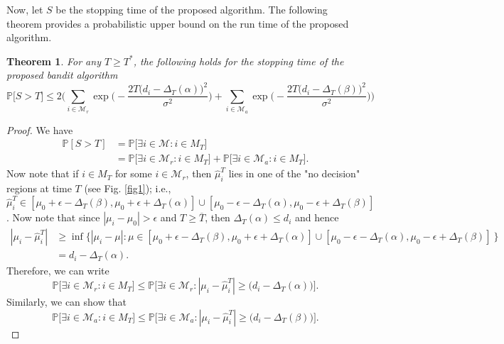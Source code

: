 \documentclass[12pt]{article}
\def\P{\mathbb{P}}
\def\MM{\mathcal{M}}
\def\T{\overline{T}}
\newtheorem{theorem}{Theorem}
\begin{document}
Now, let $S$ be the stopping time of the proposed algorithm. The following theorem provides a probabilistic upper bound on the run time of the proposed algorithm. 
\begin{theorem}
\label{thm1}
For any $T\geq T^*$, the following holds for the stopping time of the proposed bandit algorithm
\begin{equation}
\label{runbound1}
\P\big[S>T\big]\leq 2\Bigg(\sum_{i\in\MM_r}\exp\bigg(-\frac{2T\big(d_i - \Delta_T(\alpha)\big)^2}{\sigma^2}\bigg)+\sum_{i\in\MM_a}\exp\bigg(-\frac{2T\big(d_i - \Delta_T(\beta)\big)^2}{\sigma^2}\bigg)\Bigg)
\end{equation}
\end{theorem}
\begin{proof}
We have
\begin{equation}
\label{thm1eq0}
\begin{aligned}
\P[S>T] & = \P\big[\exists i\in\MM: i\in M_T\big] \\
&=\P\big[\exists i\in\MM_r: i\in M_T\big] + \P\big[\exists i\in\MM_a: i\in M_T\big] .
\end{aligned}
\end{equation}
Now note that if $i\in M_T$ for some $i\in \MM_r$, then $\hat\mu_i^T$ lies in one of the "no decision" regions at time $T$ (see Fig. \ref{fig1}); i.e., $\hat\mu_i^T \in [\mu_0+\epsilon-\Delta_T(\beta), \mu_0+\epsilon +\Delta_T(\alpha)]\cup [\mu_0-\epsilon-\Delta_T(\alpha), \mu_0-\epsilon +\Delta_T(\beta)]$. Now note that since  $|\mu_i-\mu_0|>\epsilon$ and $T\geq\T$, then $\Delta_T(\alpha)\leq d_i$ and hence 
\begin{equation*}
\begin{aligned}
|\mu_i - \hat\mu^T_i|  &\geq \inf\Big\{|\mu_i-\mu| : \mu\in [\mu_0+\epsilon-\Delta_T(\beta), \mu_0+\epsilon +\Delta_T(\alpha)]\cup [\mu_0-\epsilon-\Delta_T(\alpha), \mu_0-\epsilon +\Delta_T(\beta)]~\Big\}\\
& = d_i - \Delta_T(\alpha).
\end{aligned}
\end{equation*}
Therefore, we can write 
\begin{equation}
\label{thm1eq1}
\P\big[\exists i\in\MM_r: i\in M_T\big] \leq \P\big[\exists i\in\MM_r: |\mu_i-\hat\mu^T_i|\geq \big(d_i-\Delta_T(\alpha)\big)\big].
\end{equation}
Similarly, we can show that 
\begin{equation}
\label{thm1eq2}
\P\big[\exists i\in\MM_a: i\in M_T\big] \leq \P\big[\exists i\in\MM_a: |\mu_i-\hat\mu^T_i|\geq \big(d_i-\Delta_T(\beta)\big)\big].
\end{equation}


\end{proof}
\end{document}
